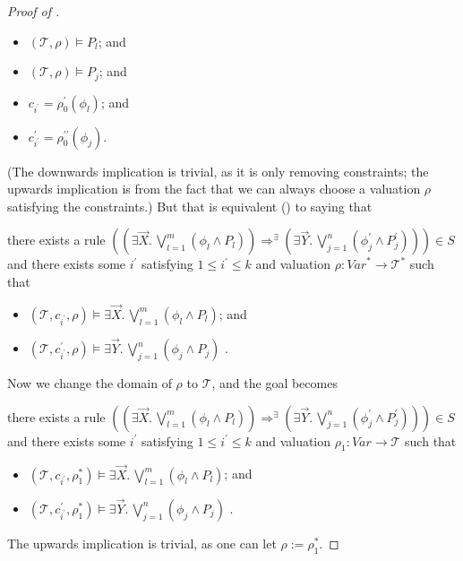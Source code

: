 \documentclass{article}
\newenvironment{proofenv}
  {
    \VerbatimEnvironment\begin{tcolorbox}[colback=black!0!white] %
  }
  {
   \end{tcolorbox}
  }
\begin{document}
\begin{proof}[Proof of ]
\begin{proofenv}
\begin{itemize}
    \item $(\mathcal{T}, \rho) \vDash P_l$; and
    \item $(\mathcal{T}, \rho) \vDash P_j$; and
    \item $c_{i^\prime} = \rho_0^\prime(\phi_l)$; and
    \item $c^\prime_{i^\prime} = \rho_0^{\prime\prime}(\phi_j)$.
\end{itemize}
\end{proofenv}
(The downwards implication is trivial, as it is only removing constraints; the upwards implication
is from the fact that we can always choose a valuation $\rho$ satisfying the constraints.)
But that is equivalent () to saying that 
\begin{proofenv}
there exists a rule $((\exists \vec{X}.\, \bigvee_{l=1}^{m} (\phi_l \land P_l)) \Rightarrow^\exists (\exists \vec{Y}.\, \bigvee_{j=1}^{n} (\phi^\prime_j \land P^\prime_j))) \in S$
and there exists some $i^\prime$ satisfying $1 \leq i^\prime \leq k$
and valuation $\rho : \mathit{Var}^* \to \mathcal{T}^*$ such that
\begin{itemize}
    \item $(\mathcal{T}, c_{i^\prime}, \rho) \vDash \exists \vec{X}.\, \bigvee_{l=1}^{m} (\phi_l \land P_l)$; and
    \item $(\mathcal{T}, c^\prime_{i^\prime}, \rho) \vDash \exists \vec{Y}.\, \bigvee_{j=1}^{n} (\phi_j \land P_j)$
    .
\end{itemize}
\end{proofenv}
Now we change the domain of $\rho$ to $\mathcal{T}$, and the goal becomes
\begin{proofenv}
there exists a rule $((\exists \vec{X}.\, \bigvee_{l=1}^{m} (\phi_l \land P_l)) \Rightarrow^\exists (\exists \vec{Y}.\, \bigvee_{j=1}^{n} (\phi^\prime_j \land P^\prime_j))) \in S$
and there exists some $i^\prime$ satisfying $1 \leq i^\prime \leq k$
and valuation $\rho_1 : \mathit{Var} \to \mathcal{T}$ such that
\begin{itemize}
    \item $(\mathcal{T}, c_{i^\prime}, \rho_1^*) \vDash \exists \vec{X}.\, \bigvee_{l=1}^{m} (\phi_l \land P_l)$; and
    \item $(\mathcal{T}, c^\prime_{i^\prime}, \rho_1^*) \vDash \exists \vec{Y}.\, \bigvee_{j=1}^{n} (\phi_j \land P_j)$
    .
\end{itemize}
\end{proofenv}
The upwards implication is trivial, as one can let $\rho := \rho_1^*$.

\end{proof}
\end{document}
